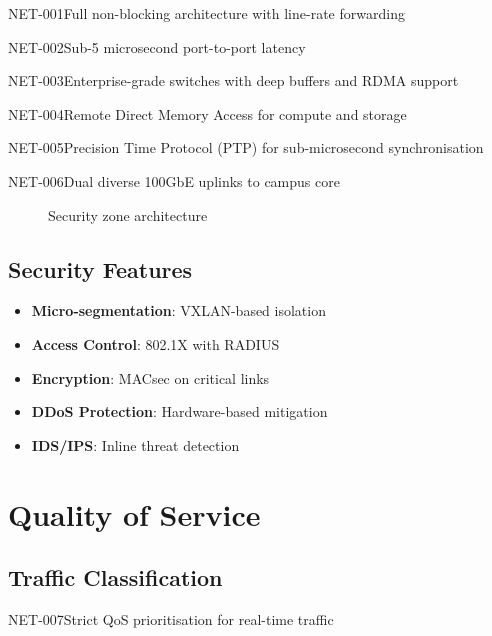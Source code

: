 \begin{requirement}{NET-001}{Full non-blocking architecture with line-rate forwarding}
\begin{requirement}{NET-002}{Sub-5 microsecond port-to-port latency}
\begin{requirement}{NET-003}{Enterprise-grade switches with deep buffers and RDMA support}
\begin{requirement}{NET-004}{Remote Direct Memory Access for compute and storage}
\begin{requirement}{NET-005}{Precision Time Protocol (PTP) for sub-microsecond synchronisation}
\begin{requirement}{NET-006}{Dual diverse 100GbE uplinks to campus core}
\begin{figure}[H]
\caption{Security zone architecture}
\end{figure}

\subsection{Security Features}

\begin{itemize}
    \item \textbf{Micro-segmentation}: VXLAN-based isolation
    \item \textbf{Access Control}: 802.1X with RADIUS
    \item \textbf{Encryption}: MACsec on critical links
    \item \textbf{DDoS Protection}: Hardware-based mitigation
    \item \textbf{IDS/IPS}: Inline threat detection
\end{itemize}

\section{Quality of Service}

\subsection{Traffic Classification}

\begin{requirement}{NET-007}{Strict QoS prioritisation for real-time traffic}


\end{requirement}
\end{requirement}
\end{requirement}
\end{requirement}
\end{requirement}
\end{requirement}
\end{requirement}
